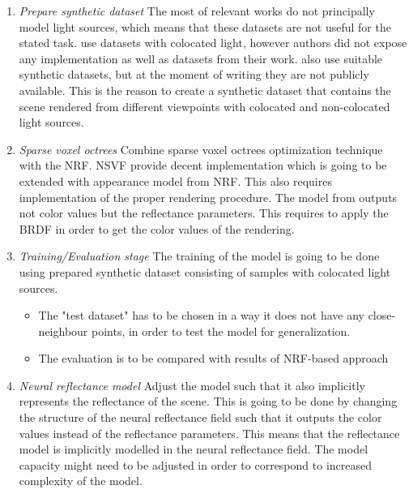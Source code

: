 \documentclass[english]{article}
\begin{document}
\begin{enumerate}

    \item \textit{Prepare synthetic dataset}
    The most of relevant works do not principally model light sources, which means that these datasets are not useful for the stated task.
    \cite{nrf2020} use datasets with colocated light, however authors did not expose any implementation as well as datasets from their work.
    \cite{srinivasan2020nerv} also use suitable synthetic datasets, but at the moment of writing they are not publicly available.
    This is the reason to create a synthetic dataset that contains the scene rendered from different viewpoints with colocated and non-colocated light sources.
    
    \item \textit{Sparse voxel octrees}
    Combine sparse voxel octrees optimization technique with the NRF. NSVF provide decent implementation which is going to be extended with appearance model from NRF. This also requires implementation of the proper rendering procedure.
    The model from \cite{nrf2020} outputs not color values but the reflectance parameters.
    This requires to apply the BRDF in order to get the color values of the rendering.
    
    \item \textit{Training/Evaluation stage}
    The training of the model is going to be done using prepared synthetic dataset consisting of samples with colocated light sources.
    \begin{itemize}
        \item The "test dataset" has to be chosen in a way it does not have any close-neighbour points, in order to test the model for generalization.
        \item The evaluation is to be compared with results of NRF-based approach \cite{nrf2020}
    \end{itemize}
    
    \item \textit{Neural reflectance model}
    Adjust the model such that it also implicitly represents the reflectance of the scene. This is going to be done by changing the structure of the neural reflectance field such that it outputs the color values instead of the reflectance parameters. This means that the reflectance model is implicitly modelled in the neural reflectance field. The model capacity might need to be adjusted in order to correspond to increased complexity of the model.
    

\end{enumerate}
\end{document}
